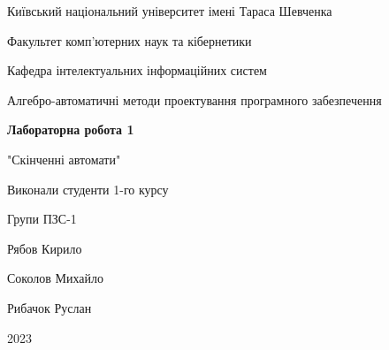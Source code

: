 \documentclass[12pt,a4paper]{article}
\begin{document}
\begin{titlepage}
    \centering
    \vspace*{1cm}

    \Large
    Київський національний університет імені Тараса Шевченка \\

    \vspace{0.5cm}

    \large
    Факультет комп'ютерних наук та кібернетики \\

    \vspace{0.5cm}

    Кафедра інтелектуальних інформаційних систем \\

    \vspace{0.5cm}

    Алгебро-автоматичні методи проектування програмного забезпечення \\

    \vspace{3cm}

    \textbf{Лабораторна робота 1} \\

    \vspace{0.5cm}

    "Скінченні автомати" \\

    \vspace{2cm}

    Виконали студенти 1-го курсу \\

    \vspace{0.2cm}

    Групи ПЗС-1 \\

    \vspace{0.1cm}

    Рябов Кирило \\

    \vspace{0.1cm}

    Соколов Михайло \\

    \vspace{0.1cm}

    Рибачок Руслан \\

    \vfill

    2023

\end{titlepage}
\end{document}
